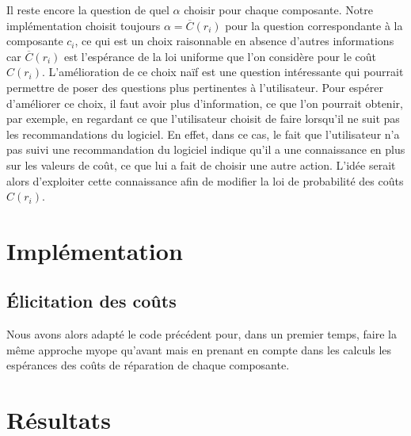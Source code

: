 \documentclass[a4paper,11pt]{article}
\theoremstyle{plain}
\begin{document}
Il reste encore la question de quel $\alpha$ choisir pour chaque composante. Notre implémentation choisit toujours $\alpha = \overline C(r_i)$ pour la question correspondante à la composante $c_i$, ce qui est un choix raisonnable en absence d'autres informations car $\overline C(r_i)$ est l'espérance de la loi uniforme que l'on considère pour le coût $C(r_i)$. L'amélioration de ce choix naïf est une question intéressante qui pourrait permettre de poser des questions plus pertinentes à l'utilisateur. Pour espérer d'améliorer ce choix, il faut avoir plus d'information, ce que l'on pourrait obtenir, par exemple, en regardant ce que l'utilisateur choisit de faire lorsqu'il ne suit pas les recommandations du logiciel. En effet, dans ce cas, le fait que l'utilisateur n'a pas suivi une recommandation du logiciel indique qu'il a une connaissance en plus sur les valeurs de coût, ce que lui a fait de choisir une autre action. L'idée serait alors d'exploiter cette connaissance afin de modifier la loi de probabilité des coûts $C(r_i)$.

\section{Implémentation}
\label{SecImplementation}

\subsection{Élicitation des coûts}

Nous avons alors adapté le code précédent pour, dans un premier temps, faire la même approche myope qu'avant mais en prenant en compte dans les calculs les espérances des coûts de réparation de chaque composante.

\section{Résultats}
\label{SecResultats}




\end{document}
